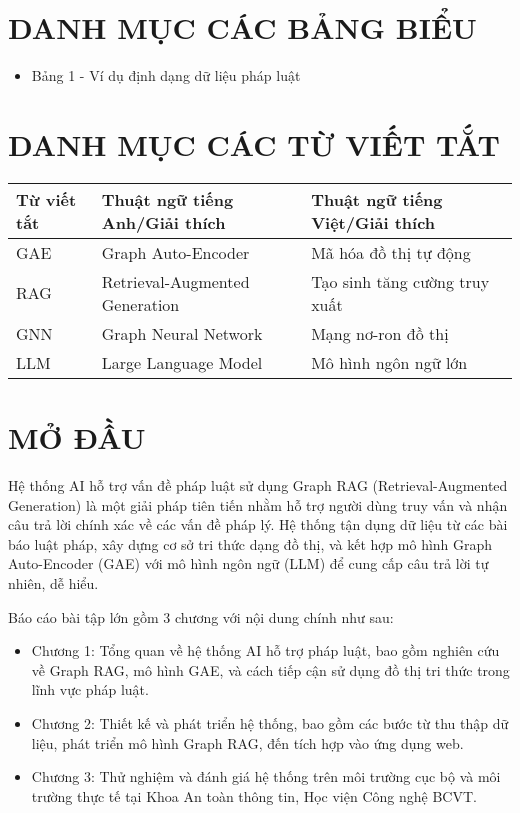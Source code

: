 \documentclass[a4paper,12pt]{article}
\begin{document}
\section*{DANH MỤC CÁC BẢNG BIỂU}
\begin{itemize}
    \item Bảng 1 - Ví dụ định dạng dữ liệu pháp luật 
\end{itemize}
\clearpage

\section*{DANH MỤC CÁC TỪ VIẾT TẮT}
\begin{table}[h!]
\centering
\begin{tabular}{|p{2cm}|p{6cm}|p{6cm}|}
\hline
\textbf{Từ viết tắt} & \textbf{Thuật ngữ tiếng Anh/Giải thích} & \textbf{Thuật ngữ tiếng Việt/Giải thích} \\ \hline
GAE & Graph Auto-Encoder & Mã hóa đồ thị tự động \\ \hline
RAG & Retrieval-Augmented Generation & Tạo sinh tăng cường truy xuất \\ \hline
GNN & Graph Neural Network & Mạng nơ-ron đồ thị \\ \hline
LLM & Large Language Model & Mô hình ngôn ngữ lớn \\ \hline
\end{tabular}
\end{table}

\clearpage

\section{MỞ ĐẦU}
Hệ thống AI hỗ trợ vấn đề pháp luật sử dụng Graph RAG (Retrieval-Augmented Generation) là một giải pháp tiên tiến nhằm hỗ trợ người dùng truy vấn và nhận câu trả lời chính xác về các vấn đề pháp lý. Hệ thống tận dụng dữ liệu từ các bài báo luật pháp, xây dựng cơ sở tri thức dạng đồ thị, và kết hợp mô hình Graph Auto-Encoder (GAE) với mô hình ngôn ngữ (LLM) để cung cấp câu trả lời tự nhiên, dễ hiểu.

Báo cáo bài tập lớn gồm 3 chương với nội dung chính như sau:
\begin{itemize}
    \item Chương 1: Tổng quan về hệ thống AI hỗ trợ pháp luật, bao gồm nghiên cứu về Graph RAG, mô hình GAE, và cách tiếp cận sử dụng đồ thị tri thức trong lĩnh vực pháp luật.
    \item Chương 2: Thiết kế và phát triển hệ thống, bao gồm các bước từ thu thập dữ liệu, phát triển mô hình Graph RAG, đến tích hợp vào ứng dụng web.
    \item Chương 3: Thử nghiệm và đánh giá hệ thống trên môi trường cục bộ và môi trường thực tế tại Khoa An toàn thông tin, Học viện Công nghệ BCVT.
\end{itemize}
\clearpage
\end{document}
